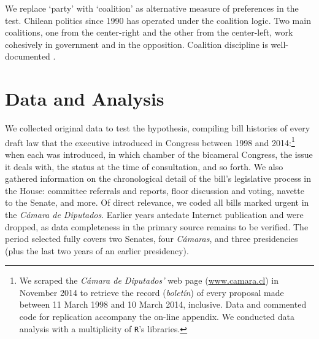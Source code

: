 \documentclass[letter,12pt]{article}
\begin{document}
We replace `party' with `coalition' as alternative measure of preferences in the test. Chilean politics since 1990 has operated under the coalition logic. Two main coalitions, one from the center-right and the other from the center-left, work cohesively in government and in the opposition. Coalition discipline is well-documented \citep{carey.2002,aleman.saiegh.coalUnityChile.2007}. 


\section{Data and Analysis}

We collected original data to test the hypothesis, compiling bill histories of every draft law that the executive introduced in Congress between 1998 and 2014:\footnote{We scraped the \emph{Cámara de Diputados'} web page (\url{www.camara.cl}) in November 2014 to retrieve the record (\emph{boletín}) of every proposal made between 11 March 1998 and 10 March 2014, inclusive. Data and commented code for replication accompany the on-line appendix. We conducted data analysis with a multiplicity of \texttt{R}'s libraries.} when each was introduced, in which chamber of the bicameral Congress, the issue it deals with, the status at the time of consultation, and so forth. We also gathered information on the chronological detail of the bill's legislative process in the House: committee referrals and reports, floor discussion and voting, navette to the Senate, and more. Of direct relevance, we coded all bills marked urgent in the \emph{Cámara de Diputados}. Earlier years antedate Internet publication and were dropped, as data completeness in the primary source remains to be verified. The period selected fully covers two Senates, four \emph{Cámaras}, and three presidencies (plus the last two years of an earlier presidency).
\end{document}
